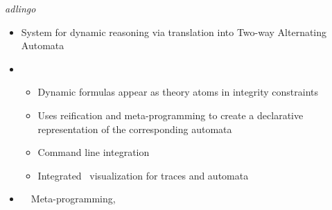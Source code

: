 \begin{frame}{\textit{adlingo}}
  \begin{itemize}
    \item {} System for dynamic reasoning via translation into Two-way Alternating Automata
    \item {} 
      \begin{itemize}
      \item Dynamic formulas appear as theory atoms in integrity constraints
      \item Uses reification and meta-programming to create a declarative representation of the corresponding automata
      \item Command line integration 
      \item Integrated \clingraph\ visualization for traces and automata
      \end{itemize}
    \item {} \ \clingo\ Meta-programming, \clingraph
  \end{itemize}
\end{frame}
%
